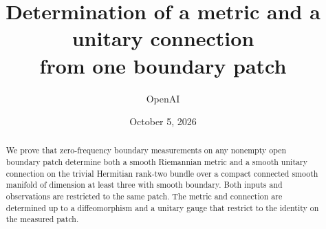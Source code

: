 \documentclass[11pt,a4paper]{article}
\title{Determination of a metric and a unitary connection\\from one boundary patch}
\author{OpenAI}
\date{October 5, 2026}
\begin{document}
\maketitle
\begin{abstract}
We prove that zero-frequency boundary measurements on any nonempty open
boundary patch determine both a smooth Riemannian metric and a smooth
unitary connection on the trivial Hermitian rank-two bundle over a compact
connected smooth manifold of dimension at least three with smooth boundary.
Both inputs and observations are restricted to the same patch. The metric
and connection are determined up to a diffeomorphism and a unitary gauge
that restrict to the identity on the measured patch.
\end{abstract}
{\small\tableofcontents}









\end{document}
